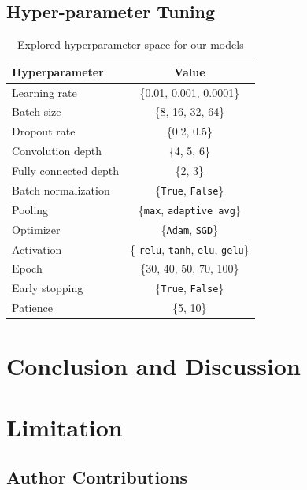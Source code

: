 \subsection{Hyper-parameter Tuning}
\label{sec:optim:tuning}

\begin{table}[ht]
  \centering
  \begin{tabular}{@{}lc@{}}
    \toprule
    Hyperparameter & Value \\
    \midrule
    Learning rate & \{0.01, 0.001, 0.0001\}  \\
    Batch size & \{8, 16, 32, 64\} \\
    Dropout rate & \{0.2, 0.5\} \\
    Convolution depth & \{4, 5, 6\} \\
    Fully connected depth & \{2, 3\} \\
    Batch normalization & \{\texttt{True}, \texttt{False}\} \\
    Pooling & \{\texttt{max}, \texttt{adaptive avg}\} \\
    Optimizer & \{\texttt{Adam}, \texttt{SGD}\} \\
    Activation & \{ \texttt{relu}, \texttt{tanh}, \texttt{elu}, \texttt{gelu}\} \\
    Epoch & \{30, 40, 50, 70, 100\} \\
    Early stopping & \{\texttt{True}, \texttt{False}\} \\
    Patience & \{5, 10\} \\
    \bottomrule
  \end{tabular}
  \caption{Explored hyperparameter space for our models}
  \label{tab:hyper}
\end{table}

\section{Conclusion and Discussion}
\label{sec:conclusion}

\section{Limitation}
\label{sec:limitation}

\subsection*{Author Contributions}
\label{sec:author}

